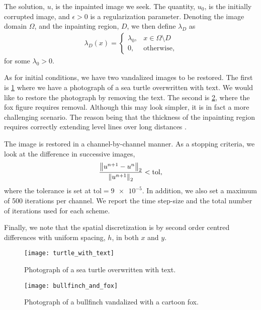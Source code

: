 The solution, $u$, is the inpainted image we seek. The quantity, $u_0$, is the initially corrupted image, and $\epsilon > 0$ is a regularization parameter. Denoting the image domain $\Omega$, and the inpainting region, $D$, we then define $\lambda_D$ as 
\begin{align}
\lambda_D(x)
= \begin{cases}
\lambda_0, & x\in \Omega\setminus D
\\
0, &\text{otherwise},
\end{cases}
\end{align}
for some $\lambda_0 > 0$.

As for initial conditions, we have two vandalized images to be restored. The first is \cref{fig:turtle with text} where we have a photograph of a sea turtle overwritten with text. We would like to restore the photograph by removing the text. The second is \cref{fig:bullfinch and fox}, where the fox figure requires removal. Although this may look simpler, it is in fact a more challenging scenario. The reason being that the thickness of the inpainting region requires correctly extending level lines over long distances \cite{schonlieb2011unconditionally}.

The image is restored in a channel-by-channel manner. As a stopping criteria, we look at the difference in successive images, 
\begin{align}
        \frac{\left\lVert u^{n+1} - u^n\right\rVert_2}{\left\lVert u^{n+1}\right\rVert_2} < \mathrm{tol},
\end{align}
where the tolerance is set at $\mathrm{tol}=\num{9e-5}$.  In addition, we also set a maximum of 500 iterations per channel. We report the time step-size and the total number of iterations used for each scheme.

Finally, we note that the spatial discretization is by second order centred differences with uniform spacing, $h$, in both $x$ and $y$.
\begin{figure}[htb!]
        \centering 
\texttt{[image: turtle\_with\_text]}
\caption[Photograph of turtle overwritten with text.]{Photograph of a sea turtle overwritten with text.}
\label{fig:turtle with text}
\end{figure}

\begin{figure}[htb!]
        \centering 
\texttt{[image: bullfinch\_and\_fox]}
\caption[Photograph of a bullfinch vandalized by a cartoonish fox.]{Photograph of a bullfinch vandalized with a cartoon fox.}
\label{fig:bullfinch and fox}
\end{figure}

